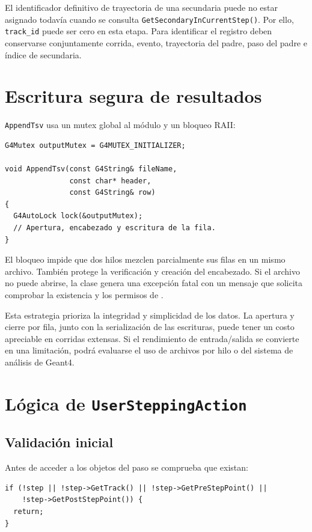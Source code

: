 \documentclass[11pt,a4paper]{article}
\newcommand{\codigo}[1]{\nolinkurl{#1}}
\newcommand{\archivo}[1]{\path{#1}}
\begin{document}
El identificador definitivo de trayectoria de una secundaria puede no estar
asignado todavía cuando se consulta \codigo{GetSecondaryInCurrentStep()}. Por
ello, \codigo{track_id} puede ser cero en esta etapa. Para identificar el
registro deben conservarse conjuntamente corrida, evento, trayectoria del
padre, paso del padre e índice de secundaria.

\section{Escritura segura de resultados}

\codigo{AppendTsv} usa un mutex global al módulo y un bloqueo RAII:

\begin{lstlisting}
G4Mutex outputMutex = G4MUTEX_INITIALIZER;

void AppendTsv(const G4String& fileName,
               const char* header,
               const G4String& row)
{
  G4AutoLock lock(&outputMutex);
  // Apertura, encabezado y escritura de la fila.
}
\end{lstlisting}

El bloqueo impide que dos hilos mezclen parcialmente sus filas en un mismo
archivo. También protege la verificación y creación del encabezado. Si el
archivo no puede abrirse, la clase genera una excepción fatal con un mensaje
que solicita comprobar la existencia y los permisos de
\archivo{Datos-simulacion/}.

Esta estrategia prioriza la integridad y simplicidad de los datos. La apertura
y cierre por fila, junto con la serialización de las escrituras, puede tener un
costo apreciable en corridas extensas. Si el rendimiento de entrada/salida se
convierte en una limitación, podrá evaluarse el uso de archivos por hilo o del
sistema de análisis de Geant4.

\section{Lógica de \texorpdfstring{\codigo{UserSteppingAction}}{UserSteppingAction}}

\subsection{Validación inicial}

Antes de acceder a los objetos del paso se comprueba que existan:

\begin{lstlisting}
if (!step || !step->GetTrack() || !step->GetPreStepPoint() ||
    !step->GetPostStepPoint()) {
  return;
}
\end{lstlisting}
\end{document}
